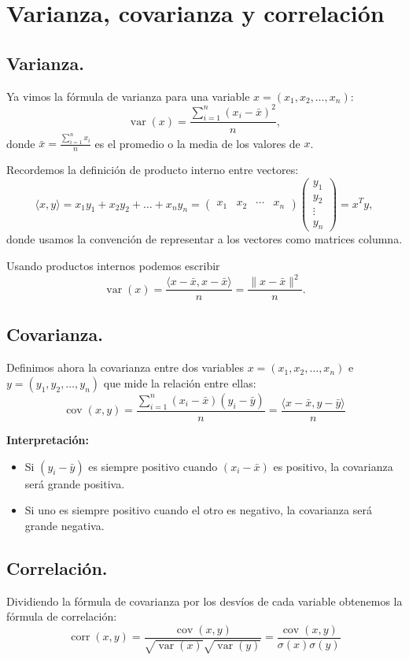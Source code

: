 \documentclass[a4paper]{article}
\DeclareMathOperator{\var}{var}
\DeclareMathOperator{\cov}{cov}
\DeclareMathOperator{\corr}{corr}
\begin{document}
\section{Varianza, covarianza y correlación}

\subsection{Varianza.} 
Ya vimos la f\'ormula de varianza para una variable $x = (x_1, x_2, \dots, x_n)$:
$$
\var(x) = \frac{\sum_{i=1}^n(x_i - \bar x)^2}{n},
$$
donde $\bar x = \frac{\sum_{i = 1}^n x_i}{n}$ es el promedio o la media de los valores de $x$.

Recordemos la definición de producto interno entre vectores:
$$\langle x, y\rangle = x_1 y_1 + x_2 y_2 + \dots + x_n y_n = \begin{pmatrix} x_1 & x_2 & \cdots & x_n \end{pmatrix} \begin{pmatrix} y_1 \\ y_2 \\ \vdots \\ y_n \end{pmatrix} = x^T y,$$
donde usamos la convención de representar a los vectores como matrices columna.

Usando productos internos podemos escribir
$$
\var(x) = \frac{\langle x - \bar x,  x - \bar x \rangle}{n} = \frac{\| x - \bar x\|^2}{n}.
$$


\subsection{Covarianza.} Definimos ahora la covarianza entre dos variables $x = (x_1, x_2, \dots, x_n)$ e $y = (y_1, y_2, \dots, y_n)$ que mide la relaci\'on entre ellas:
$$
\cov(x,y) = \frac{\sum_{i = 1}^n (x_i - \bar x)(y_i - \bar y)}{n}= \frac{\langle x - \bar x , y - \bar y \rangle}{n}
$$

\textbf{Interpretaci\'on:}
\begin{itemize}
\item Si $(y_i - \bar y)$ es siempre positivo cuando $(x_i - \bar x)$ es positivo, la covarianza será grande positiva.
\item Si uno es siempre positivo cuando el otro es negativo, la covarianza será grande negativa.
\end{itemize}

\subsection{Correlaci\'on.} Dividiendo la fórmula de covarianza por los desvíos de cada variable obtenemos la fórmula de correlación:
$$
\corr(x,y) = \frac{\cov(x, y)}{\sqrt{\var(x)}\sqrt{\var(y)}} = \frac{\cov(x, y)}{\sigma(x)\sigma(y)}
$$
\end{document}
